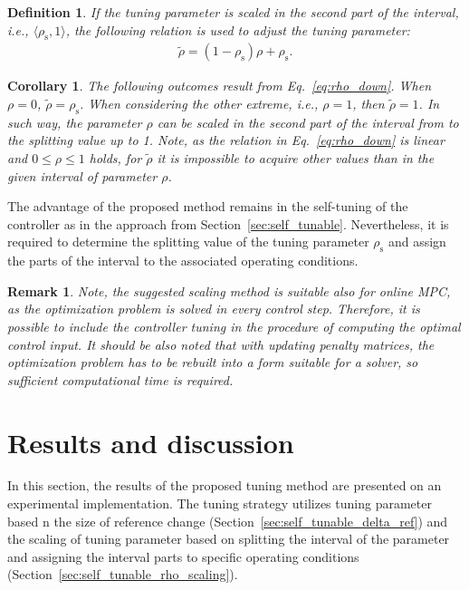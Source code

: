 \documentclass[preprint,12pt]{elsarticle}
\newtheorem{remark}[theorem]{Remark}
\newtheorem{corollary}{Corollary}[theorem]
\newtheorem{definition}{Definition}[section]
\begin{document}
\begin{definition}
	If the tuning parameter is scaled in the second part of the interval, i.e., $\langle \rho_{\mathrm{s}}, 1 \rangle$, the following relation is used to adjust the tuning parameter:	
	\begin{eqnarray}
		\label{eq:rho_down}
		\widetilde{\rho} = (1-\rho_{\mathrm{s}}) \rho + \rho_{\mathrm{s}}.
	\end{eqnarray}
\end{definition}

\begin{corollary}
	The following outcomes result from Eq.~\eqref{eq:rho_down}. When $\rho=0$, $\widetilde{\rho} = \rho_{\mathrm{s}}$. When considering the other extreme, i.e., $\rho=1$, then $\widetilde{\rho} = 1$. In such way, the parameter $\rho$ can be scaled in the second part of the interval from to the splitting value up to 1. Note, as the relation in Eq.~\eqref{eq:rho_down} is linear and $0 \le \rho \le 1$ holds, for $\widetilde{\rho}$ it is impossible to acquire other values than in the given interval of parameter $\rho$.
\end{corollary}

The advantage of the proposed method remains in the self-tuning of the controller as in the approach from Section~\ref{sec:self_tunable}. Nevertheless, it is required to determine the splitting value of the tuning parameter $\rho_{\mathrm{s}}$ and assign the parts of the interval to the associated operating conditions.

\begin{remark}
	Note, the suggested scaling method is suitable also for online MPC, as the optimization problem is solved in every control step. Therefore, it is possible to include the controller tuning in the procedure of computing the optimal control input. It should be also noted that with updating penalty matrices, the optimization problem has to be rebuilt into a form suitable for a solver, so sufficient computational time is required.  
\end{remark}

\section{Results and discussion}
\label{sec:results}

In this section, the results of the proposed tuning method are presented on an experimental implementation. The tuning strategy utilizes tuning parameter based n the size of reference change (Section~\ref{sec:self_tunable_delta_ref}) and the scaling of tuning parameter based on splitting the interval of the parameter and assigning the interval parts to specific operating conditions (Section~\ref{sec:self_tunable_rho_scaling}).
\end{document}
